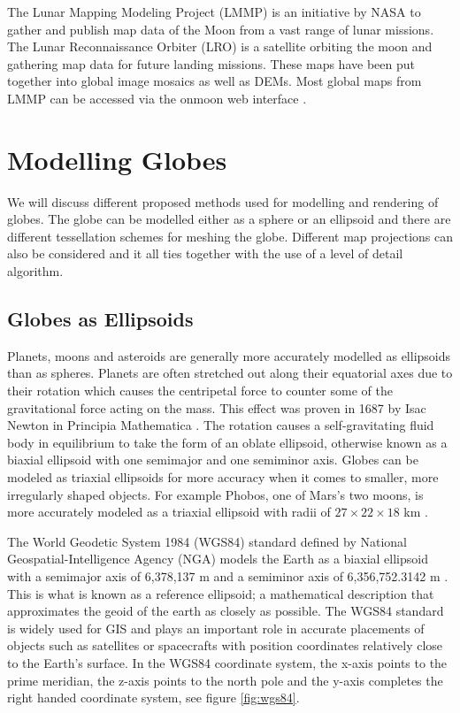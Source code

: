 The Lunar Mapping Modeling Project (LMMP) is an initiative by NASA to gather and publish map data of the Moon from a vast range of lunar missions. The Lunar Reconnaissance Orbiter (LRO) is a satellite orbiting the moon and gathering map data for future landing missions. These maps have been put together into global image mosaics as well as DEMs. Most global maps from LMMP can be accessed via the onmoon web interface \cite{onmoon}.



\section{Modelling Globes}

We will discuss different proposed methods used for modelling and rendering of globes. The globe can be modelled either as a sphere or an ellipsoid and there are different tessellation schemes for meshing the globe. Different map projections can also be considered and it all ties together with the use of a level of detail algorithm.


\subsection{Globes as Ellipsoids}

Planets, moons and asteroids are generally more accurately modelled as ellipsoids than as spheres. Planets are often stretched out along their equatorial axes due to their rotation which causes the centripetal force to counter some of the gravitational force acting on the mass. This effect was proven in 1687 by Isac Newton in Principia Mathematica \cite{newton87}. The rotation causes a self-gravitating fluid body in equilibrium to take the form of an oblate ellipsoid, otherwise known as a biaxial ellipsoid with one semimajor and one semiminor axis. Globes can be modeled as triaxial ellipsoids for more accuracy when it comes to smaller, more irregularly shaped objects. For example Phobos, one of Mars's two moons, is more accurately modeled as a triaxial ellipsoid with radii of $27 \times 22 \times 18$ km \cite{cozzi11}.

The World Geodetic System 1984 (WGS84) standard defined by National Geospatial-Intelligence Agency (NGA) models the Earth as a biaxial ellipsoid with a semimajor axis of 6,378,137 m and a semiminor axis of 6,356,752.3142 m \cite{cozzi11}. This is what is known as a reference ellipsoid; a mathematical description that approximates the geoid of the earth as closely as possible. The WGS84 standard is widely used for GIS and plays an important role in accurate placements of objects such as satellites or spacecrafts with position coordinates relatively close to the Earth's surface. In the WGS84 coordinate system, the x-axis points to the prime meridian, the z-axis points to the north pole and the y-axis completes the right handed coordinate system, see figure \ref{fig:wgs84}.

